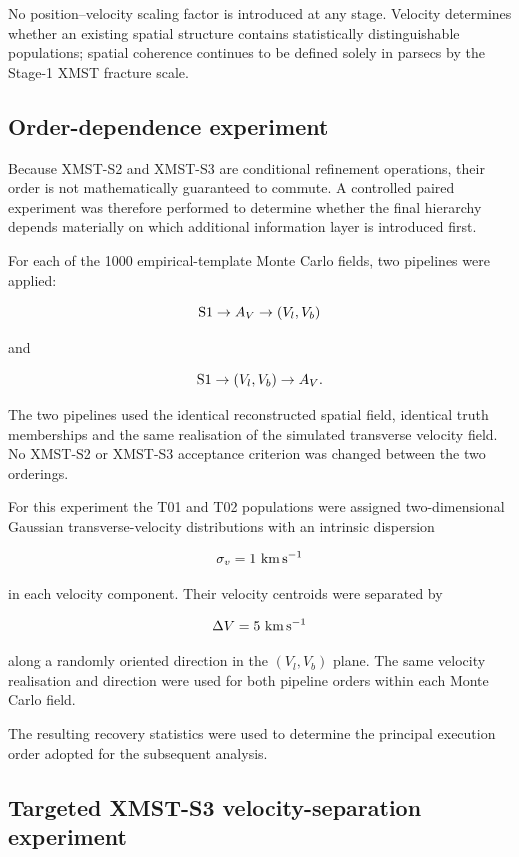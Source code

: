 \documentclass[fleqn,usenatbib]{rasti}
\begin{document}
No position--velocity scaling factor is introduced at any stage. Velocity
determines whether an existing spatial structure contains statistically
distinguishable populations; spatial coherence continues to be defined
solely in parsecs by the Stage-1 XMST fracture scale.


\subsection{Order-dependence experiment}
\label{sec:order_test}

Because XMST-S2 and XMST-S3 are conditional refinement operations, their
order is not mathematically guaranteed to commute. A controlled paired
experiment was therefore performed to determine whether the final hierarchy
depends materially on which additional information layer is introduced
first.

For each of the 1000 empirical-template Monte Carlo fields, two pipelines
were applied:

\[
{\rm S1}\rightarrow A_V\rightarrow(V_l,V_b)
\]

and

\[
{\rm S1}\rightarrow(V_l,V_b)\rightarrow A_V.
\]

The two pipelines used the identical reconstructed spatial field, identical
truth memberships and the same realisation of the simulated transverse
velocity field. No XMST-S2 or XMST-S3 acceptance criterion was changed
between the two orderings.

For this experiment the T01 and T02 populations were assigned
two-dimensional Gaussian transverse-velocity distributions with an
intrinsic dispersion

\[
\sigma_v=1~{\rm km\,s^{-1}}
\]

in each velocity component. Their velocity centroids were separated by

\[
\Delta V=5~{\rm km\,s^{-1}}
\]

along a randomly oriented direction in the $(V_l,V_b)$ plane. The same
velocity realisation and direction were used for both pipeline orders within
each Monte Carlo field.

The resulting recovery statistics were used to determine the principal
execution order adopted for the subsequent analysis.


\subsection{Targeted XMST-S3 velocity-separation experiment}
\label{sec:s3_velocity_test}
\end{document}
